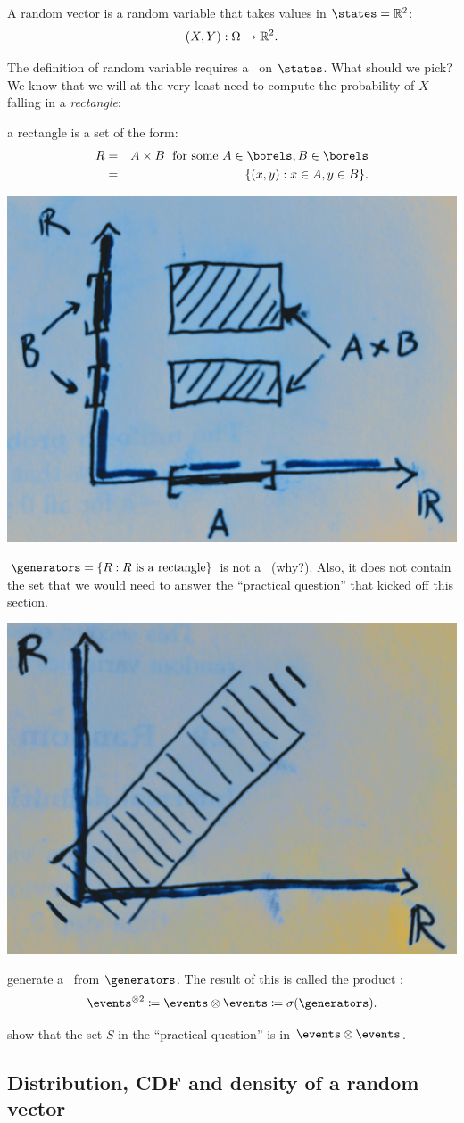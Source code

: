\documentclass{article}
\begin{document}
 A random vector is a random variable that takes values in $\states = \R^2$: \[ (X, Y) : \Omega \to {\mathbb R}^2. \]

 The definition of random variable requires a \sigmaalg\ on $\states$. What should we pick? We know that we will at the very least need to compute the probability of $X$ falling in a \emph{rectangle}:

 a rectangle is a set of the form:
\begin{eqnarray} 
R &=& A \times B \;\text{ for some }A \in \borels, B \in \borels \\
&=& \{(x, y) : x \in A, y \in B\}.
\end{eqnarray}
\begin{center}
	\includegraphics[width=0.4\linewidth]{figures/product}
\end{center}

 $\generators = \{R : R\text{ is a rectangle}\}$ is not a \sigmaalg\ (why?). Also, it does not contain the set that we would need to answer the ``practical question'' that kicked off this section.
\begin{center}
	\includegraphics[width=0.4\linewidth]{figures/strip}
\end{center}

 generate a \sigmaalg\ from $\generators$. The result of this is called the product \sigmaalg:
\[ \events^{\otimes 2} \defeq \events \otimes \events \defeq \sigma(\generators). \]

 show that the set $S$ in the ``practical question'' is in $\events \otimes \events$.


\subsection{Distribution, CDF and density of a random vector}
\end{document}
